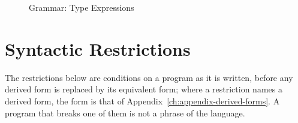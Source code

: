 \begin{figure}[tbp]
\centering
\begin{grammar}
\noalign{\smallskip}
\end{grammar}
\caption{Grammar: Type Expressions}
\label{fig:core-grammar-types}
\end{figure}

\section{Syntactic Restrictions}\label{sec:syntax-core-restrictions}

The restrictions below are conditions on a program as it is written, before
any derived form is replaced by its equivalent form; where a restriction
names a derived form, the form is that of
Appendix~\ref{ch:appendix-derived-forms}. A program that breaks one of them is
not a phrase of the language.

